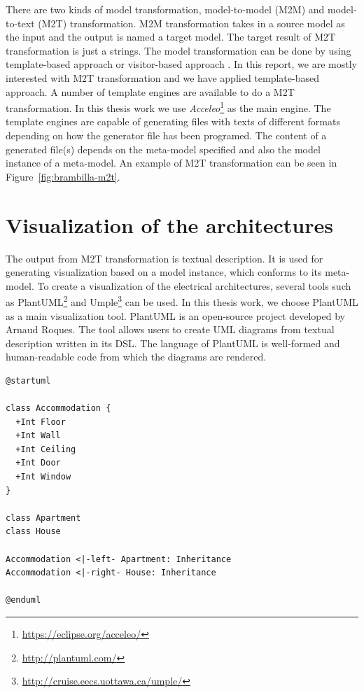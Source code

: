 There are two kinds of model transformation, model-to-model (M2M) and model-to-text (M2T) transformation. M2M transformation takes in a source model as the input and the output is named a target model. The target result of M2T transformation is just a strings. The model transformation can be done by using  template-based approach or visitor-based approach \cite{Czarnecki}. In this report, we are mostly interested with M2T transformation and we have applied template-based approach. A number of template engines are available to do a M2T transformation. In this thesis work we use \textit{Acceleo}\footnote{\url{https://eclipse.org/acceleo/}} as the main engine. The template engines are capable of generating files with texts of different formats depending on how the generator file has been programed. The content of a generated file(s) depends on the meta-model specified and also the model instance of a meta-model. An example of M2T transformation can be seen in Figure~\ref{fig:brambilla-m2t}.

\section{Visualization of the architectures}
The output from M2T transformation is textual description. It is used for generating visualization based on a model instance, which conforms to its meta-model. To create a visualization of the electrical architectures, several tools such as PlantUML\footnote{\url{http://plantuml.com/}} and Umple\footnote{\url{http://cruise.eecs.uottawa.ca/umple/}} can be used. In this thesis work, we choose PlantUML as a main visualization tool. PlantUML is an open-source project developed by Arnaud Roques. The tool allows users to create UML diagrams from textual description written in its DSL. The language of PlantUML is well-formed and human-readable code from which the diagrams are rendered.

\begin{lstlisting}[caption=An example of textual description of a class diagram, label=code:plantuml_class]
@startuml

class Accommodation {
  +Int Floor
  +Int Wall
  +Int Ceiling
  +Int Door
  +Int Window
}

class Apartment
class House

Accommodation <|-left- Apartment: Inheritance
Accommodation <|-right- House: Inheritance

@enduml
\end{lstlisting}


